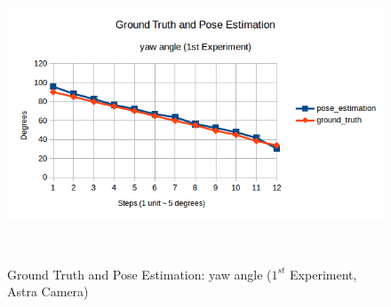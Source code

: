 \begin{figure}[!h]
\begin{center}
\includegraphics[width=5in, height=3.5in]{figures05/1_yaw_validation.png}
\caption{Ground Truth and Pose Estimation: yaw angle ($1^{st}$ Experiment, Astra Camera)}
\label{fig:erroryaw_1nd}
\end{center}
\end{figure}

